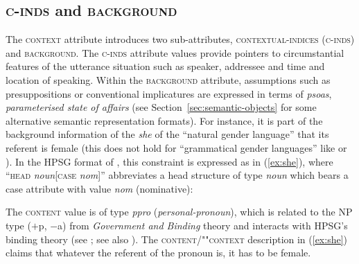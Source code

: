 \documentclass[output=paper
	        ,collection
	        ,collectionchapter
 	        ,biblatex
                ,babelshorthands
                ,newtxmath
                ,draftmode
                ,colorlinks, citecolor=brown
]{langscibook}
\begin{document}
 
\subsection{\textsc{c-inds} and \textsc{background}}
\label{sec:c-inds-background}
 
The \textsc{context}  attribute introduces two sub-attributes, \textsc{contextual-indices} (\textsc{c-inds})   and \textsc{background}. 
%
The \textsc{c-inds} attribute values provide pointers to circumstantial features of the utterance situation such as speaker, addressee and time and location of speaking.
%
Within the \textsc{background} attribute, assumptions such as presuppositions or conventional implicatures are expressed in terms of \emph{psoas}, \emph{parameterised state of affairs} (see Section~\ref{sec:semantic-objects} for some alternative semantic representation formats). 
%
For instance, it is part of the background information of the  \textit{she} of the \enquote{natural gender language}  that its referent is female (this does not hold for \enquote{grammatical gender languages} like  or ).
%
In the HPSG format of \citet[]{Pollard:Sag:1994}, this constraint is expressed as in (\ref{ex:she}), where \enquote{\textsc{head} \textit{noun}[\textsc{case} \textit{nom}]} abbreviates a head structure of type \textit{noun} which bears a case attribute with value \textit{nom} (nominative):
%
\ea \label{ex:she}
\z

The \textsc{content}  value is of type \textit{ppro} (\textit{personal-pronoun}), which is related to the NP type ($+$p, $-$a) from \emph{Government and Binding} theory \citep{Chomsky:1981} and interacts with HPSG's binding theory (see ; see also ).
%
The \textsc{content}/""\textsc{context} description in (\ref{ex:she}) claims that whatever the referent of the pronoun is, it has to be female.
\end{document}
